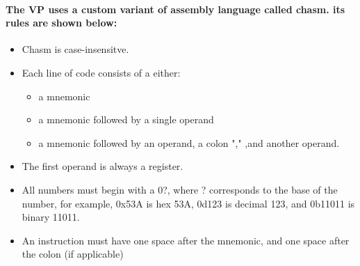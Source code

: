 \documentclass[a4paper, 11pt]{report}
\begin{document}
\paragraph{The VP uses a custom variant of assembly language called chasm. its rules are
shown below:}
\begin{itemize}
    \item Chasm is case-insensitve.
    \item Each line of code consists of a either:
     \begin{itemize}
        \item a mnemonic
        \item a mnemonic followed by a single operand
        \item a mnemonic followed by an operand, a colon "," ,and another operand.
    \end{itemize}
    \item The first operand is always a register.
    \item All numbers must begin with a 0?, where ? corresponds to the base of the number,
    for example, 0x53A is hex 53A, 0d123 is decimal 123, and 0b11011 is binary 11011.
    \item An instruction must have one space after the mnemonic, and one space after the colon (if applicable)
\end{itemize}
\end{document}
